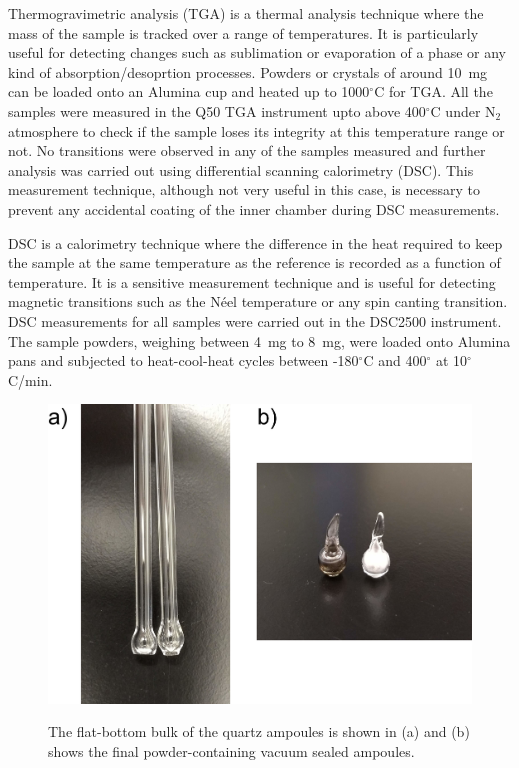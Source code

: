 \documentclass[10pt,doublespacing,edeposit]{uiucthesis2020}
\begin{document}
\begin{mainmatter}
Thermogravimetric analysis (TGA) is a thermal analysis technique where the mass of the sample is tracked over a range of temperatures. It is particularly useful for detecting changes such as sublimation or evaporation of a phase or any kind of absorption/desoprtion processes. Powders or crystals of around 10~mg can be loaded onto an Alumina cup and heated up to 1000$^\circ$C for TGA. All the samples were measured in the Q50 TGA instrument upto above 400$^\circ$C under N$_2$ atmosphere to check if the sample loses its integrity at this temperature range or not. No transitions were observed in any of the samples measured and further analysis was carried out using differential scanning calorimetry (DSC). This measurement technique, although not very useful in this case, is necessary to prevent any accidental coating of the inner chamber during DSC measurements.

DSC is a calorimetry technique where the difference in the heat required to keep the sample at the same temperature as the reference is recorded as a function of temperature. It is a sensitive measurement technique and is useful for detecting magnetic transitions such as the N\'eel temperature or any spin canting transition. DSC measurements for all samples were carried out in the DSC2500 instrument. The sample powders, weighing between 4~mg to 8~mg, were loaded onto Alumina pans and subjected to heat-cool-heat cycles between -180$^\circ$C and 400$^\circ$ at 10$^\circ$C/min.

\begin{figure}
\centering\includegraphics[width=0.6\columnwidth]{figures/ch3/DTA_tubes_combined.jpg} \\
\caption{\label{fig:DTA_tubes_combined}
The flat-bottom bulk of the quartz ampoules is shown in (a) and (b) shows the final powder-containing vacuum sealed ampoules.
}
\end{figure}


\end{mainmatter}
\end{document}
